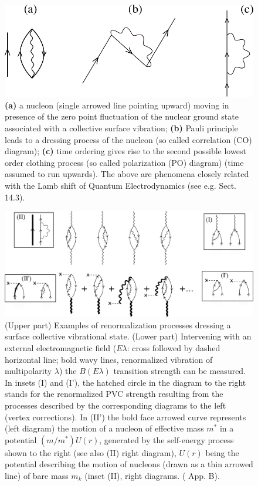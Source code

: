 \begin{figure}
	\centerline {
		\includegraphics*[width=12cm]{introduccion/figs/figpreface8}
	}
	\caption{\textbf{(a)} a nucleon (single arrowed line pointing upward) moving in presence of the zero point fluctuation of the nuclear ground state associated with a collective surface vibration; \textbf{(b)} Pauli principle leads to a dressing process of the nucleon (so called correlation (CO) diagram); \textbf{(c)} time ordering gives rise to the second possible lowest order clothing process (so called polarization (PO) diagram) (time assumed to run upwards). The above are phenomena closely related with the Lamb shift of Quantum Electrodynamics (see e.g. \cite{Weinberg:96} Sect. 14.3).}
	\label{fig1.0.8}
\end{figure}
\begin{figure}
	\centerline {
		\includegraphics*[width=15cm]{introduccion/figs/figpreface9}
	}
	\caption{(Upper part) Examples of renormalization processes dressing a surface collective vibrational state. (Lower part) Intervening with an external electromagnetic field ($E\lambda$: cross followed by dashed horizontal line; bold wavy lines, renormalized vibration of multipolarity $\lambda$) the $B(E\lambda)$ transition strength can be measured. In insets (I) and (I'), the hatched circle in the diagram to the right stands for the renormalized PVC strength resulting from the processes described by the corresponding diagrams to the left (vertex corrections). In  (II') the bold face arrowed curve represents (left diagram) the motion of a nucleon of effective mass $m^*$ in a potential $(m/m^*)U(r)$, generated by the self-energy process shown to the right (see also (II) right diagram), $U(r)$  being the potential describing the motion of nucleons (drawn as a thin  arrowed line) of bare mass $m_k$  (inset (II), right diagrams. (\cite{Brink:05} App. B).}
	\label{fig1.0.9}
\end{figure}

